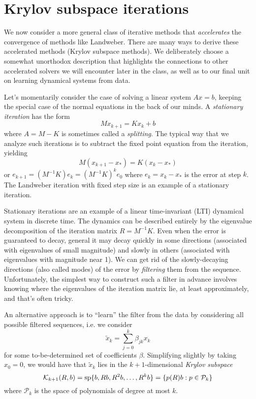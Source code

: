 \documentclass[12pt, leqno]{article} %
\begin{document}
\section{Krylov subspace iterations}


We now consider a more general class of iterative methods that
{\em accelerates} the convergence of methods like Landweber.
There are many ways to derive these accelerated methods (Krylov
subspace methods).  We deliberately choose a somewhat unorthodox
description that highlights the connections to other accelerated
solvers we will encounter later in the class, as well as to our final
unit on learning dynamical systems from data.

Let's momentarily consider the case of solving a linear system $Ax = b$,
keeping the special case of the normal equations in the back of our
minds.  A {\em stationary iteration} has the form
\[
  M x_{k+1} = K x_k + b
\]
where $A = M - K$ is sometimes called a {\em splitting}.  The typical
way that we analyze such iterations is to subtract the fixed point
equation from the iteration, yielding
\[
  M (x_{k+1}-x_*) = K (x_{k} - x_*)
\]
or $e_{k+1} = (M^{-1} K) e_k = (M^{-1} K)^k e_0$ where $e_k = x_k-x_*$
is the error at step $k$.  The Landweber iteration with fixed step
size is an example of a stationary iteration.

Stationary iterations are an example of a linear time-invariant (LTI)
dynamical system in discrete time.  The dynamics can be described
entirely by the eigenvalue decomposition of the iteration matrix
$R = M^{-1} K$.  Even when the error is guaranteed to decay, general it
may decay quickly in some directions (associated with eigenvalues of
small magnitude) and slowly in others (associated with eigenvalues
with magnitude near 1).  We can get rid of the slowly-decaying
directions (also called modes) of the error by {\em filtering} them
from the sequence.  Unfortunately, the simplest way to construct such
a filter in advance involves knowing where the eigenvalues of the
iteration matrix lie, at least approximately, and that's often tricky.

An alternative approach is to ``learn'' the filter from the data by
considering all possible filtered sequences, i.e. we consider
\[
  \tilde{x}_k = \sum_{j=0}^k \beta_{jk} x_k
\]
for some to-be-determined set of coefficients $\beta$.  Simplifying
slightly by taking $x_0 = 0$, we would have that $\tilde{x}_k$ lies in
the $k+1$-dimensional {\em Krylov subspace}
\[
  \mathcal{K}_{k+1}(R, b)
  = \mathrm{sp}\{ b, R b, R^2 b, \ldots, R^k b \}
  = \mathrm\{ p(R) b : p \in \mathcal{P}_k \}
\]
where $\mathcal{P}_k$ is the space of polynomials of degree at most
$k$.
\end{document}
